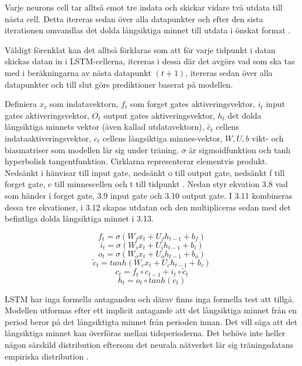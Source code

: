 \documentclass[11pt]{article}
\numberwithin{equation}{section}
\numberwithin{table}{section}
\numberwithin{figure}{section}
\begin{document}
Varje neurons cell tar alltså emot tre indata och skickar vidare två utdata till nästa cell. Detta itereras sedan över alla datapunkter och efter den sista iterationen omvandlas det dolda långsiktiga minnet till utdata i önskat format \parencite[][,s.478-559]{purkait2019hands}.

Väldigt förenklat kan det alltså förklaras som  att för varje tidpunkt i datan skickas datan in i LSTM-cellerna, itereras i dessa där det avgörs vad som ska tas med i beräkningarna av nästa datapunkt $(t+1)$, itereras sedan över alla datapunkter och till slut görs prediktioner baserat på modellen. 

Definiera \(x_t\) som indatavektorn, \(f_t\) som forget gates aktiveringsvektor, \(i_t\) input gates aktiveringsvektor, \(O_t\) output gates aktiveringsvektor, \(h_t\) det dolda långsiktiga minnets vektor (även kallad utdatavektorn), \(\tilde{c_t}\) cellens indataaktiveringsvektor, \(c_t\) cellens långsiktiga minnes-vektor, \(W, U, b\) vikt- och biasmatriser som modellen lär sig under träning. \(\sigma\) är sigmoidfunktion och tanh hyperbolisk tangentfunktion. Cirklarna representerar elementvis produkt. Nedsänkt i hänvisar till input gate, nedsänkt o till output gate, nedsänkt f till forget gate, c till minnescellen och t till tidpunkt \parencite[][,s.478-559]{purkait2019hands}. Nedan styr ekvation 3.8 vad som händer i forget gate, 3.9 input gate och 3.10 output gate. I 3.11 kombineras dessa tre ekvationer, i 3.12 skapas utdatan och den multipliceras sedan med det befintliga dolda långsiktiga minnet i 3.13.

\begin{equation}f_t = \sigma(W_f x_t + U_f h_{t-1} + b_f)\end{equation}
\begin{equation}i_t = \sigma(W_i x_t + U_i h_{t-1} + b_i)\end{equation}
\begin{equation}o_t = \sigma(W_o x_t + U_o h_{t-1} + b_o)\end{equation}
\begin{equation}\tilde{c}_t = tanh(W_c x_t + U_c h_{t-1} + b_c)\end{equation}
\begin{equation}c_t= f_t \circ c_{t-1} + i_t \circ \tilde{c}_t\end{equation}
\begin{equation}h_t= o_t \circ tanh(c_t)\end{equation}

LSTM har inga formella antaganden och därav finns inga formella test att tillgå. Modellen utformas efter ett implicit antagande att det långsiktiga minnet från en period beror på det långsiktigta minnet från perioden innan. Det vill säga att det långsiktiga minnet kan överföras mellan tidsperioderna. Det behövs inte heller någon särskild distribution eftersom det neurala nätverket lär sig träningsdatans empiriska distribution \parencite[][,s.478-559]{purkait2019hands}.
\end{document}
